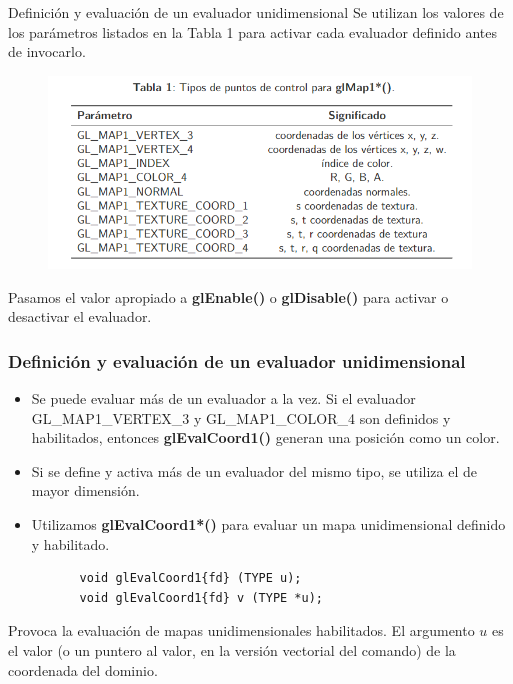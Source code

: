 \documentclass[10.5pt]{beamer}
\begin{document}
\begin{frame}{Definición y evaluación de un evaluador unidimensional}
    \justifying
Se utilizan los valores de los parámetros listados en la Tabla 1 para activar cada evaluador definido antes de invocarlo.

\begin{figure}[h]
	\centering
	\includegraphics[width=1\linewidth]{figura/Tabla.PNG}
\end{figure}
Pasamos el valor apropiado a \textbf{glEnable()} o \textbf{glDisable()} para activar o desactivar el evaluador.
\end{frame}

\begin{frame}[fragile]
    \frametitle{Definición y evaluación de un evaluador unidimensional}
    \justifying
\begin{itemize}
\justifying
    \item Se puede evaluar más de un evaluador a la vez. Si el evaluador GL\_MAP1\_VERTEX\_3 y  GL\_MAP1\_COLOR\_4 son definidos y habilitados, entonces \textbf{glEvalCoord1()} generan una posición como un color.

    \item Si se define y activa más de un evaluador del mismo tipo, se utiliza el de mayor dimensión.

    \item Utilizamos \textbf{glEvalCoord1*()} para evaluar un mapa unidimensional definido y habilitado.
\end{itemize}

\begin{alertblock}{}
\small
\begin{verbatim}
          void glEvalCoord1{fd} (TYPE u);
          void glEvalCoord1{fd} v (TYPE *u);
\end{verbatim}
\end{alertblock}

 Provoca la evaluación de mapas unidimensionales habilitados. El argumento $u$ es el valor (o un puntero al valor, en la versión vectorial del comando) de la coordenada del dominio.
\end{frame}
\end{document}

